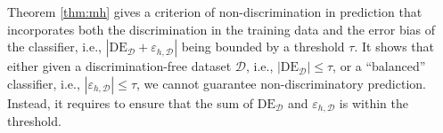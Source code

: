 \documentclass{article}
\begin{document}


Theorem \ref{thm:mh} gives a criterion of non-discrimination in prediction that incorporates both the discrimination in the training data and the error bias of the classifier, i.e., $\left|\mathrm{DE}_{\mathcal{D}}+\varepsilon_{h,\mathcal{D}}\right|$ being bounded by a threshold $\tau$. It shows that either given a discrimination-free dataset $\mathcal{D}$, i.e., $\left| \mathrm{DE}_{\mathcal{D}} \right|\leq \tau$, or a ``balanced'' classifier, i.e., $\left| \varepsilon_{h,\mathcal{D}} \right|\leq \tau$, we cannot guarantee non-discriminatory prediction. Instead, it requires to ensure that the sum of $\mathrm{DE}_{\mathcal{D}}$ and $\varepsilon_{h,\mathcal{D}}$ is within the threshold. 
\end{document}
